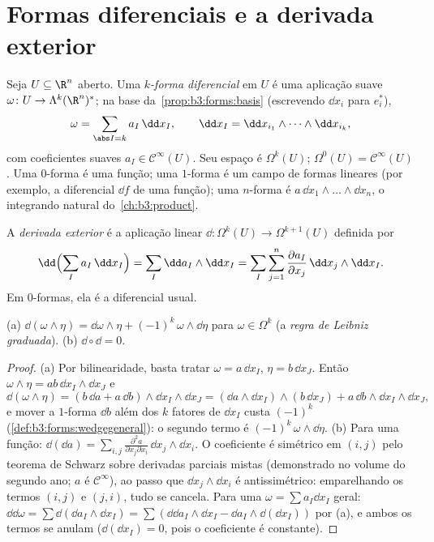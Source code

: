 \section{Formas diferenciais e a derivada exterior}

\begin{definition}\label{def:b3:forms:diffform}
Seja $U \subseteq \R^n$ aberto. Uma \emph{$k$-forma diferencial} em $U$ é uma aplicação suave $\omega\colon U \to \Lambda^k(\R^n)^*$; na base
da~\cref{prop:b3:forms:basis} (escrevendo $\dd x_i$ para $e_i^*$),
\[
\omega = \sum_{\abs I = k} a_I\,\dd x_I,
\qquad
\dd x_I = \dd x_{i_1} \wedge \dots \wedge \dd x_{i_k},
\]
com coeficientes suaves $a_I \in \mathcal C^\infty(U)$. Seu espaço é $\Omega^k(U)$; $\Omega^0(U) = \mathcal
C^\infty(U)$. Uma
$0$-forma é uma função; uma $1$-forma é um campo de formas
lineares (por exemplo, a diferencial $\dd f$ de uma função); uma
$n$-forma é $a\,\dd x_1\wedge\dots\wedge\dd
x_n$, o integrando natural do~\cref{ch:b3:product}.
\end{definition}

\begin{definition}\label{def:b3:forms:d}
A \emph{derivada exterior} é a aplicação linear
$\dd\colon \Omega^k(U) \to \Omega^{k+1}(U)$ definida por
\[
\dd\Bigl(\sum_I a_I\,\dd x_I\Bigr)
= \sum_I \dd a_I \wedge \dd x_I
= \sum_I\sum_{j=1}^n \frac{\partial a_I}{\partial
x_j}\,\dd x_j \wedge \dd x_I .
\]
Em $0$-formas, ela é a diferencial usual.
\end{definition}

\begin{theorem}\label{thm:b3:forms:dsquare}
(a) $\dd(\omega \wedge \eta) = \dd\omega \wedge \eta +
(-1)^k\,\omega \wedge \dd\eta$ para $\omega \in \Omega^k$ (a \emph{regra de Leibniz graduada}).
(b) $\dd \circ \dd = 0$.
\end{theorem}

\begin{proof}
(a) Por bilinearidade, basta tratar $\omega = a\,\dd
x_I$, $\eta = b\,\dd x_J$. Então $\omega \wedge \eta =
ab\,\dd x_I \wedge \dd x_J$ e
\[
\dd(\omega\wedge\eta) = (b\,\dd a + a\,\dd b) \wedge \dd x_I
\wedge \dd x_J
= (\dd a \wedge \dd x_I) \wedge (b\,\dd x_J) +
a\,\dd b \wedge \dd x_I \wedge \dd x_J,
\]
e mover a $1$-forma $\dd b$ além dos $k$ fatores de $\dd
x_I$
custa $(-1)^k$ (\cref{def:b3:forms:wedgegeneral}): o segundo termo é $(-1)^k\,\omega \wedge \dd\eta$.
(b) Para uma função: $\dd(\dd a) = \sum_{i,j}
\frac{\partial^2a}{\partial x_j\partial x_i}\,\dd x_j \wedge
\dd x_i$. O coeficiente é simétrico em $(i,j)$
pelo teorema de Schwarz sobre derivadas parciais mistas (demonstrado no
volume do segundo ano; $a$ é $\mathcal C^\infty$), ao passo que $\dd x_j \wedge
\dd x_i$ é
antissimétrico: emparelhando os termos $(i,j)$ e $(j,i)$, tudo se
cancela. Para uma $\omega = \sum
a_I\dd x_I$ geral: $\dd\dd\omega = \sum\dd(\dd a_I \wedge \dd x_I)
= \sum(\dd\dd a_I\wedge\dd x_I - \dd a_I\wedge\dd(\dd x_I))$ por (a), e ambos os termos se anulam
($\dd(\dd x_I) = 0$, pois o coeficiente é constante).
\end{proof}

